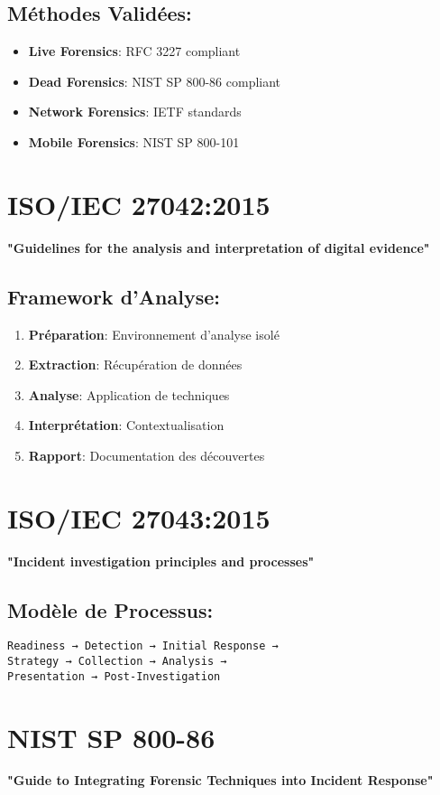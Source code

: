 \subsection{Méthodes Validées:}
\begin{itemize}
\item \textbf{Live Forensics}: RFC 3227 compliant
\item \textbf{Dead Forensics}: NIST SP 800-86 compliant
\item \textbf{Network Forensics}: IETF standards
\item \textbf{Mobile Forensics}: NIST SP 800-101
\end{itemize}

\section{ISO/IEC 27042:2015}
\textbf{"Guidelines for the analysis and interpretation of digital evidence"}

\subsection{Framework d'Analyse:}
\begin{enumerate}
\item \textbf{Préparation}: Environnement d'analyse isolé
\item \textbf{Extraction}: Récupération de données
\item \textbf{Analyse}: Application de techniques
\item \textbf{Interprétation}: Contextualisation
\item \textbf{Rapport}: Documentation des découvertes
\end{enumerate}

\section{ISO/IEC 27043:2015}
\textbf{"Incident investigation principles and processes"}

\subsection{Modèle de Processus:}
\begin{verbatim}
Readiness → Detection → Initial Response →
Strategy → Collection → Analysis →
Presentation → Post-Investigation
\end{verbatim}

\section{NIST SP 800-86}
\textbf{"Guide to Integrating Forensic Techniques into Incident Response"}

